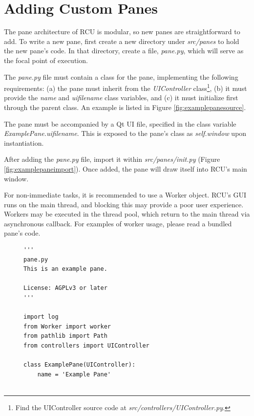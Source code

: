 \documentclass{memoir}
\begin{document}
{\section{Adding Custom Panes}
\label{sec:devcustompanes}
The pane architecture of RCU is modular, so new panes are straightforward to add. To write a new pane, first create a new directory under \textit{src/panes} to hold the new pane's code. In that directory, create a file, \textit{pane.py}, which will serve as the focal point of execution.

The \textit{pane.py} file must contain a class for the pane, implementing the following requirements: (a) the pane must inherit from the \textit{UIController} class\footnote{\raggedleft Find the \linebreak UIController source code at \textit{src/controllers/UIController.py}.}, (b) it must provide the \textit{name} and \textit{ui\textunderscore filename} class variables, and (c) it must initialize first through the parent class. An example is listed in Figure \ref{fig:examplepanesource}.

The pane must be accompanied by a Qt UI file, specified in the class variable \linebreak\textit{ExamplePane.ui\textunderscore filename}. This is exposed to the pane's class as \textit{self.window} upon instantiation.

After adding the \textit{pane.py} file, import it within \textit{src/panes/\textunderscore \textunderscore init\textunderscore \textunderscore.py} (Figure \ref{fig:examplepaneimport}). Once added, the pane will draw itself into RCU's main window.

For non-immediate tasks, it is recommended to use a Worker object. RCU's GUI runs on the main thread, and blocking this may provide a poor user experience. Workers may be executed in the thread pool, which return to the main thread via asynchronous callback. For examples of worker usage, please read a bundled pane's code.


\begin{figure}[h]
\begin{verbatim}
'''
pane.py
This is an example pane.

License: AGPLv3 or later
'''

import log
from Worker import worker
from pathlib import Path
from controllers import UIController

class ExamplePane(UIController):
    name = 'Example Pane'


\end{verbatim}
\end{figure}}
\end{document}
